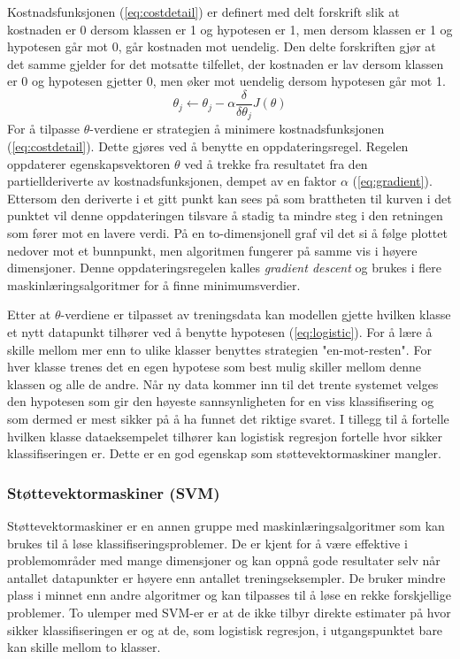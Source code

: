 Kostnadsfunksjonen (\ref{eq:costdetail}) er definert med delt forskrift slik at kostnaden er 0 dersom klassen er 1 og hypotesen er 1, men dersom klassen er 1 og hypotesen går mot 0, går kostnaden mot uendelig. Den delte forskriften gjør at det samme gjelder for det motsatte tilfellet, der kostnaden er lav dersom klassen er 0 og hypotesen gjetter 0, men øker mot uendelig dersom hypotesen går mot 1.
\begin{equation}
\theta_j \leftarrow \theta_j - \alpha \frac{\delta}{\delta\theta_j}J(\theta)
\label{eq:gradient}
\end{equation}
For å tilpasse $\theta$-verdiene er strategien å minimere kostnadsfunksjonen (\ref{eq:costdetail}). Dette gjøres ved å benytte en oppdateringsregel. Regelen oppdaterer egenskapsvektoren $\theta$ ved å trekke fra resultatet fra den partiellderiverte av kostnadsfunksjonen, dempet av en faktor $\alpha$ (\ref{eq:gradient}). Ettersom den deriverte i et gitt punkt kan sees på som brattheten til kurven i det punktet vil denne oppdateringen tilsvare å stadig ta mindre steg i den retningen som fører mot en lavere verdi. På en to-dimensjonell graf vil det si å følge plottet nedover mot et bunnpunkt, men algoritmen fungerer på samme vis i høyere dimensjoner. Denne oppdateringsregelen kalles \emph{gradient descent} og brukes i flere maskinlæringsalgoritmer for å finne minimumsverdier.

Etter at $\theta$-verdiene er tilpasset av treningsdata kan modellen gjette hvilken klasse et nytt datapunkt tilhører ved å benytte hypotesen (\ref{eq:logistic}). For å lære å skille mellom mer enn to ulike klasser benyttes strategien "en-mot-resten". For hver klasse trenes det en egen hypotese som best mulig skiller mellom denne klassen og alle de andre. Når ny data kommer inn til det trente systemet velges den hypotesen som gir den høyeste sannsynligheten for en viss klassifisering og som dermed er mest sikker på å ha funnet det riktige svaret. I tillegg til å fortelle hvilken klasse dataeksempelet tilhører kan logistisk regresjon fortelle hvor sikker klassifiseringen er. Dette er en god egenskap som støttevektormaskiner mangler.\\

\subsubsection*{Støttevektormaskiner (SVM)}
Støttevektormaskiner er en annen gruppe med maskinlæringsalgoritmer som kan brukes til å løse klassifiseringsproblemer. De er kjent for å være effektive i problemområder med mange dimensjoner og kan oppnå gode resultater selv når antallet datapunkter er høyere enn antallet treningseksempler. De bruker mindre plass i minnet enn andre algoritmer og kan tilpasses til å løse en rekke forskjellige problemer. To ulemper med SVM-er er at de ikke tilbyr direkte estimater på hvor sikker klassifiseringen er og at de, som logistisk regresjon, i utgangspunktet bare kan skille mellom to klasser.

